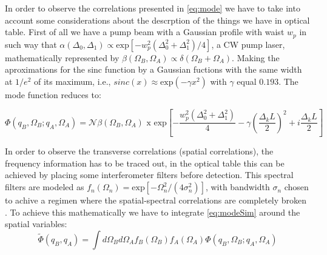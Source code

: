 In order to observe the correlations presented in \ref{eq:mode} we have to take into account some considerations about the descrption of the things we have in optical table.
First of all we have a pump beam with a Gaussian profile with waist $w_p$ 
in such way that $\alpha (\Delta_0,\Delta_1 ) \propto \text{exp}[-w_p^2 (\Delta_0^2 + \Delta_1^2 )/4]$, a CW pump laser, mathematically represented by
$\beta (\Omega_B , \Omega_A) \propto \delta(\Omega_B + \Omega_A)$. Making the aproximations for the sinc function by a Gaussian fuctions with the same width at $1/e^2$ of its maximum,
i.e., $sinc(x) \approx \text{exp}(-\gamma x^2)$ with $\gamma$ equal $0.193$.
The mode function reduces to:

\begin{equation}
\label{eq:modeSim}
\Phi(q_B,\Omega_B;q_A,\Omega_A) = \mathcal{N} \beta (\Omega_B , \Omega_A)
\text{ x exp}\left[ -\frac{w_p^2 (\Delta_0^2 + \Delta_1^2 )}{4}-\gamma \left(\frac{\Delta_k L}{2} \right)^2 + i\frac{\Delta_k L}{2} \right]  
\end{equation}

In order to observe the transverse correlations (spatial correlations), the 
frequency information has to be traced out, in the optical table this can
be achieved by placing some interferometer filters before detection. This spectral
filters are modeled as $f_n (\Omega_n)=\text{exp}[-\Omega_n^2/(4\sigma_n^2)]$, with bandwidth $\sigma_n$ chosen to achive a regimen where the 
spatial-spectral correlations are completely broken \cite{broke}. 
To achieve this mathematically we have to integrate \ref{eq:modeSim} around the
spatial variables:
\begin{equation}
\label{eq:modeSpa}
\tilde{\Phi}(q_B,q_A) = \int d\Omega_B d\Omega_A f_B(\Omega_B)f_A(\Omega_A) \Phi(q_B,\Omega_B;q_A,\Omega_A)
\end{equation}

